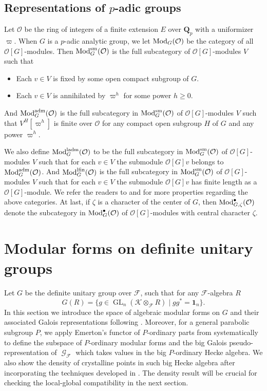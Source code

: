 \documentclass[leqno]{amsart}
\theoremstyle{definition}
\theoremstyle{remark}
\newcommand{\id}{\mathbf{1}}
\newcommand{\oo}{\mathcal{O}}
\newcommand{\Qp}{\mathbf{Q}_p}
\DeclareMathOperator{\GL}{GL}
\DeclareMathOperator{\Gal}{\mathcal{G}}
\DeclareMathOperator{\Mod}{\textnormal{Mod}}
\newcommand{\sm}{\textnormal{sm}}
\newcommand{\adm}{\textnormal{adm}}
\newcommand{\ladm}{\textnormal{ladm}}
\newcommand{\lfin}{\textnormal{lfin}}
\newcommand{\F}{{\mathcal{F}}} %
\newcommand{\K}{{\mathcal{K}}} %
\begin{document}
\subsection{Representations of $p$-adic groups}

Let $\oo$ be the ring of integers of a finite extension $E$
over  $\Qp$ with a uniformizer $\varpi$.
When $G$ is a $p$-adic analytic group,
we let $\Mod_G(\oo)$ be the category
of all $\oo[G]$-modules.
Then $\Mod^{\sm}_{G}(\oo)$ is the full subcategory 
of $\oo[G]$-modules $V$ such that 
\begin{itemize}
    \item Each $v\in V$ is fixed by some open compact subgroup of $G$.
    \item Each $v\in V$ is annihilated by $\varpi^h$ for some power 
    $h\geq 0$.
\end{itemize}
And $\Mod^{\adm}_{G}(\oo)$ is the full subcategory 
in $\Mod^{\sm}_{G}(\oo)$ of $\oo[G]$-modules $V$ such that 
$V^H[\varpi^h]$ is finite over $\oo$
for any compact open subgroup $H$ of $G$ and any power $\varpi^h$.

We also define $\Mod^{\ladm}_{G}(\oo)$ to be the full subcategory 
in $\Mod^{\sm}_{G}(\oo)$ of $\oo[G]$-modules $V$ 
such that for each $v\in V$ 
the submodule $\oo[G]v$ belongs to $\Mod^{\adm}_G(\oo)$.
And $\Mod^{\lfin}_G(\oo)$ is the full subcategory 
in $\Mod^{\sm}_{G}(\oo)$ of $\oo[G]$-modules $V$ 
such that for each $v\in V$ 
the submodule $\oo[G]v$ has finite length as a $\oo[G]$-module.
We refer the readers to \cite[\S 2]{emeI} and \cite[\S 2]{pask}
for more properties regarding the above categories.
At last, if $\zeta$ is a character of the center of $G$,
then $\Mod^{\bullet}_{G,\zeta}(\oo)$
denote the subcategory in $\Mod^{\bullet}_{G}(\oo)$ of 
$\oo[G]$-modules with central character $\zeta$.






\section{Modular forms on definite unitary groups}

Let $G$ be the definite unitary group over $\F$,
such that for any $\F$-algebra $R$
\begin{equation}\label{def:def_unitary}
    G(R)=\{g\in \GL_{n}(\K\otimes_\F R) \mid gg^*=\id_n\}.
\end{equation}
In this section we introduce
the space of algebraic modular forms on $G$
and their associated Galois representations
following \cite{ger}.
Moreover, for a general parabolic subgroup $P$,
we apply Emerton's functor of $P$-ordinary parts from \cite{emeI}
systematically to define 
the subspace of $P$-ordinary modular forms
and the big Galois pseudo-representation of $\Gal_\F$
which takes values in the big $P$-ordinary Hecke algebra.
We also show the density of crystalline points 
in such big Hecke algebra
after incorporating the techniques developed in \cite{pan}.
The density result will be crucial for checking
the local-global compatibility in the next section.
\end{document}
